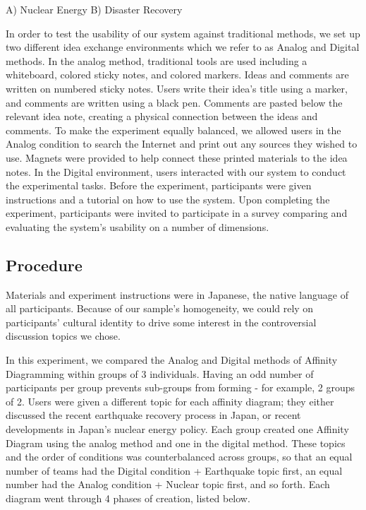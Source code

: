 \documentclass{sigchi}
\begin{document}
A) Nuclear Energy
B) Disaster Recovery 

In order to test the usability of our system against traditional methods, we set up two different idea exchange environments which we refer to as Analog and Digital methods. In the analog method, traditional tools are used including a whiteboard, colored sticky notes, and colored markers. Ideas and comments are written on numbered sticky notes. Users write their idea's title using a marker, and comments are written using a black pen. Comments are pasted below the relevant idea note, creating a physical connection between the ideas and comments. To make the experiment equally balanced, we allowed users in the Analog condition to search the Internet and print out any sources they wished to use. Magnets were provided to help connect these printed materials to the idea notes. In the Digital environment, users interacted with our system to conduct the experimental tasks. Before the experiment, participants were given instructions and a tutorial on how to use the system. Upon completing the experiment, participants were invited to participate in a survey comparing and evaluating the system's usability on a number of dimensions.

\subsection{Procedure}

Materials and experiment instructions were in Japanese, the native language of all participants. Because of our sample's homogeneity, we could rely on participants' cultural identity to drive some interest in the controversial discussion topics we chose.

In this experiment, we compared the Analog and Digital methods of Affinity Diagramming within groups of 3 individuals. Having an odd number of participants per group prevents sub-groups from forming - for example, 2 groups of 2. Users were given a different topic for each affinity diagram; they either discussed the recent earthquake recovery process in Japan, or recent developments in Japan's nuclear energy policy. Each group created one Affinity Diagram using the analog method and one in the digital method. These topics and the order of conditions was counterbalanced across groups, so that an equal number of teams had the Digital condition + Earthquake topic first, an equal number had the Analog condition + Nuclear topic first, and so forth. Each diagram went through 4 phases of creation, listed below.
\end{document}
